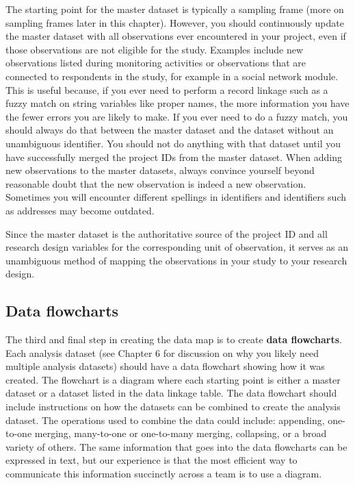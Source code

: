 The starting point for the master dataset is typically a sampling frame
(more on sampling frames later in this chapter).
However, you should continuously update the master dataset with
all observations ever encountered in your project,
even if those observations are not eligible for the study.
Examples include new observations listed during monitoring activities
or observations that are connected to respondents in the study,
for example in a social network module.
This is useful because,
if you ever need to perform a record linkage such as a fuzzy match
on string variables like proper names,
the more information you have the fewer errors you are likely to make.
If you ever need to do a fuzzy match,
you should always do that between the master dataset
and the dataset without an unambiguous identifier.
You should not do anything with that dataset until
you have successfully merged
the project IDs from the master dataset.
When adding new observations to the master datasets,
always convince yourself beyond reasonable doubt
that the new observation is indeed a new observation.
Sometimes you will encounter different spellings in identifiers
and identifiers such as addresses may become outdated.

Since the master dataset is the authoritative source
of the project ID and all research design variables
for the corresponding unit of observation,
it serves as an unambiguous method of mapping
the observations in your study to your research design.

\subsection{Data flowcharts}

The third and final step in creating the data map is
to create \textbf{data flowcharts}.
Each analysis dataset
(see Chapter 6 for discussion on why you likely need multiple analysis datasets)
should have a data flowchart showing how it was created.
The flowchart is a diagram
where each starting point is either a master dataset
or a dataset listed in the data linkage table.
The data flowchart should include instructions on how
the datasets can be combined to create the analysis dataset.
The operations used to combine the data could include:
appending, one-to-one merging,
many-to-one or one-to-many merging, collapsing, or a broad variety of others.
The same information that goes into the data flowcharts can be expressed in text,
but our experience is that the most efficient way
to communicate this information succinctly across a team is to use a diagram.


